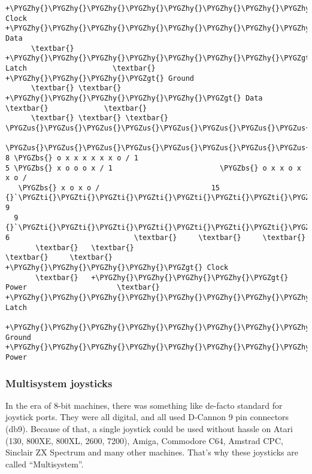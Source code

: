 \documentclass[a4paper,8pt,english]{sphinxmanual}
\def\PYGZbs{\char`\\}
\def\PYGZus{\char`\_}
\def\PYGZgt{\char`\>}
\def\PYGZhy{\char`\-}
\def\PYGZsq{\char`\'}
\def\PYGZti{\char`\~}
\renewcommand\PYGZsq{\textquotesingle}
\begin{document}
\begin{Verbatim}[commandchars=\\\{\}]
      +\PYGZhy{}\PYGZhy{}\PYGZhy{}\PYGZhy{}\PYGZhy{}\PYGZhy{}\PYGZhy{}\PYGZhy{}\PYGZhy{}\PYGZgt{} Clock                    +\PYGZhy{}\PYGZhy{}\PYGZhy{}\PYGZhy{}\PYGZhy{}\PYGZhy{}\PYGZhy{}\PYGZhy{}\PYGZhy{}\PYGZhy{}\PYGZhy{}\PYGZhy{}\PYGZhy{}\PYGZhy{}\PYGZhy{}\PYGZhy{}\PYGZhy{}\PYGZgt{} Data
      \textbar{} +\PYGZhy{}\PYGZhy{}\PYGZhy{}\PYGZhy{}\PYGZhy{}\PYGZhy{}\PYGZhy{}\PYGZgt{} Latch                    \textbar{}             +\PYGZhy{}\PYGZhy{}\PYGZhy{}\PYGZgt{} Ground
      \textbar{} \textbar{} +\PYGZhy{}\PYGZhy{}\PYGZhy{}\PYGZhy{}\PYGZhy{}\PYGZgt{} Data                     \textbar{}             \textbar{}
      \textbar{} \textbar{} \textbar{}                              \PYGZus{}\PYGZus{}\PYGZus{}\PYGZus{}\PYGZus{}\PYGZus{}\PYGZus{}\PYGZus{}\PYGZus{}\PYGZus{}\PYGZus{}\PYGZus{}\PYGZus{}\PYGZus{}\PYGZus{}\PYGZus{}\PYGZus{}\PYGZus{}\PYGZus{}
  \PYGZus{}\PYGZus{}\PYGZus{}\PYGZus{}\PYGZus{}\PYGZus{}\PYGZus{}\PYGZus{}\PYGZus{}\PYGZus{}\PYGZus{}\PYGZus{}\PYGZus{}                        8 \PYGZbs{} o x x x x x x o / 1
5 \PYGZbs{} x o o o x / 1                         \PYGZbs{} o x x o x x o /
   \PYGZbs{} x o x o /                          15 {}`\PYGZti{}\PYGZti{}\PYGZti{}\PYGZti{}\PYGZti{}\PYGZti{}\PYGZti{}\PYGZti{}\PYGZti{}\PYGZti{}\PYGZti{}\PYGZti{}\PYGZti{}\PYGZsq{} 9
  9 {}`\PYGZti{}\PYGZti{}\PYGZti{}\PYGZti{}\PYGZti{}\PYGZti{}\PYGZti{}\PYGZsq{} 6                             \textbar{}     \textbar{}     \textbar{}
       \textbar{}   \textbar{}                                \textbar{}     \textbar{}     +\PYGZhy{}\PYGZhy{}\PYGZhy{}\PYGZhy{}\PYGZgt{} Clock
       \textbar{}   +\PYGZhy{}\PYGZhy{}\PYGZhy{}\PYGZhy{}\PYGZgt{} Power                     \textbar{}     +\PYGZhy{}\PYGZhy{}\PYGZhy{}\PYGZhy{}\PYGZhy{}\PYGZhy{}\PYGZhy{}\PYGZhy{}\PYGZhy{}\PYGZhy{}\PYGZgt{} Latch
       +\PYGZhy{}\PYGZhy{}\PYGZhy{}\PYGZhy{}\PYGZhy{}\PYGZhy{}\PYGZhy{}\PYGZhy{}\PYGZgt{} Ground                    +\PYGZhy{}\PYGZhy{}\PYGZhy{}\PYGZhy{}\PYGZhy{}\PYGZhy{}\PYGZhy{}\PYGZhy{}\PYGZhy{}\PYGZhy{}\PYGZhy{}\PYGZhy{}\PYGZhy{}\PYGZhy{}\PYGZhy{}\PYGZhy{}\PYGZgt{} Power
\end{Verbatim}


\subsubsection{Multisystem joysticks}
\label{input/devices/joystick-parport:multisystem-joysticks}
In the era of 8-bit machines, there was something like de-facto standard
for joystick ports. They were all digital, and all used D-Cannon 9 pin
connectors (db9). Because of that, a single joystick could be used without
hassle on Atari (130, 800XE, 800XL, 2600, 7200), Amiga, Commodore C64,
Amstrad CPC, Sinclair ZX Spectrum and many other machines. That's why these
joysticks are called ``Multisystem''.
\end{document}
